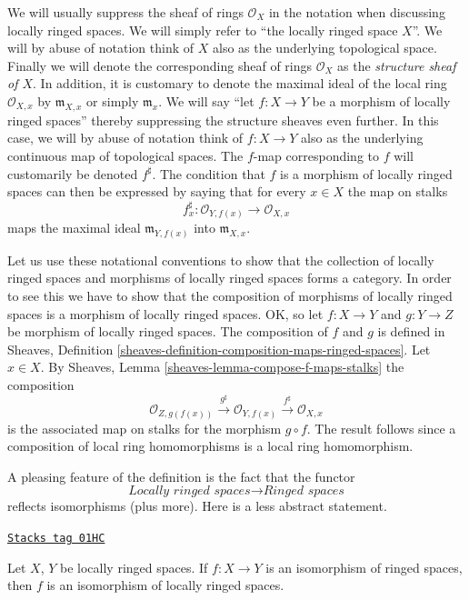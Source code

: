 We will usually suppress the sheaf of rings $\mathcal{O}_X$
in the notation when discussing locally ringed spaces. We will
simply refer to ``the locally ringed space $X$''.
We will by abuse of notation think of $X$ also as
the underlying topological space. Finally we will denote
the corresponding sheaf of rings
$\mathcal{O}_X$ as the {\it structure sheaf of $X$}.
In addition, it is customary to denote the maximal ideal
of the local ring $\mathcal{O}_{X, x}$ by
$\mathfrak{m}_{X, x}$ or simply $\mathfrak{m}_x$.
We will say ``let $f : X \to Y$ be a morphism of locally ringed
spaces'' thereby suppressing the structure sheaves even further.
In this case, we will by abuse of notation think of $f : X\to Y$
also as the underlying continuous map of topological spaces.
The $f$-map corresponding to $f$ will customarily
be denoted $f^\sharp$. The condition that $f$ is a morphism
of locally ringed spaces can then be expressed by saying that
for every $x\in X$ the map on stalks
$$
f^\sharp_x : \mathcal{O}_{Y, f(x)} \longrightarrow \mathcal{O}_{X, x}
$$
maps the maximal ideal $\mathfrak m_{Y, f(x)}$ into
$\mathfrak m_{X, x}$.

\medskip\noindent
Let us use these notational conventions to show that the
collection of locally ringed spaces and morphisms of locally
ringed spaces forms a category. In order to see this we have
to show that the composition of morphisms of locally ringed
spaces is a morphism of locally ringed spaces. OK, so let
$f : X \to Y$ and $g : Y \to Z$ be morphism of locally
ringed spaces. The composition of $f$ and $g$ is defined in
Sheaves, Definition \ref{sheaves-definition-composition-maps-ringed-spaces}.
Let $x \in X$. By
Sheaves, Lemma \ref{sheaves-lemma-compose-f-maps-stalks}
the composition
$$
\mathcal{O}_{Z, g(f(x))}
\xrightarrow{g^\sharp}
\mathcal{O}_{Y, f(x)}
\xrightarrow{f^\sharp}
\mathcal{O}_{X, x}
$$
is the associated map on stalks for the morphism $g \circ f$.
The result follows since a composition of local ring
homomorphisms is a local ring homomorphism.

\medskip\noindent
A pleasing feature of the definition is the fact that the functor
$$
\textit{Locally ringed spaces}
\longrightarrow
\textit{Ringed spaces}
$$
reflects isomorphisms (plus more).
Here is a less abstract statement.

\begin{lemma}
\label{schemes-lemma-isomorphism-locally-ringed}
\href{https://stacks.math.columbia.edu/tag/01HC}{\texttt{Stacks tag 01HC}}


Let $X$, $Y$ be locally ringed spaces.
If $f : X \to Y$ is an isomorphism of
ringed spaces, then $f$ is an isomorphism
of locally ringed spaces.
\end{lemma}

